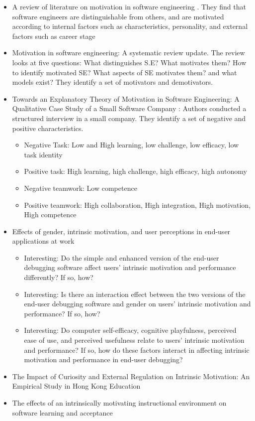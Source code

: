 \documentclass[conference]{IEEEtran}
\begin{document}
\begin{itemize}
\item
  A review of literature on motivation in software engineering
  \cite{beecham2008motivation}. They find that software engineers
  are distinguishable from others, and are motivated according to
  internal factors such as characteristics, personality, and external
  factors such as career stage
\item
  Motivation in software engineering: A systematic review
  update\cite{francca2011motivation}. The review looks at five
  questions: What distinguishes S.E? What motivates them? How to
  identify motivated SE? What aspects of SE motivates them? and what
  models exist? They identify a set of motivators and demotivators.
\item
  Towards an Explanatory Theory of Motivation in Software Engineering: A
  Qualitative Case Study of a Small Software Company
  \cite{francca2012towards}: Authors conducted a structured
  interview in a small company. They identify a set of negative and
  positive characteristics.

  \begin{itemize}
  \item
    Negative Task: Low and High learning, low challenge, low efficacy,
    low task identity
  \item
    Positive task: High learning, high challenge, high efficacy, high
    autonomy
  \item
    Negative teamwork: Low competence
  \item
    Positive teamwork: High collaboration, High integration, High
    motivation, High competence
  \end{itemize}
\item
  Effects of gender, intrinsic motivation, and user perceptions in
  end-user applications at work \cite{chintakovid2009effects}

  \begin{itemize}
  \item
    Interesting: Do the simple and enhanced version of the end-user
    debugging software affect users' intrinsic motivation and
    performance differently? If so, how?
  \item
    Interesting: Is there an interaction effect between the two versions
    of the end-user debugging software and gender on users' intrinsic
    motivation and performance? If so, how?
  \item
    Interesting: Do computer self-efficacy, cognitive playfulness,
    perceived ease of use, and perceived usefulness relate to users'
    intrinsic motivation and performance? If so, how do these factors
    interact in affecting intrinsic motivation and performance in
    end-user debugging?
  \end{itemize}
\item
  The Impact of Curiosity and External Regulation on Intrinsic
  Motivation: An Empirical Study in Hong Kong
  Education\cite{hon2012impact}
\item
  The effects of an intrinsically motivating instructional environment
  on software learning and acceptance\cite{davis1994effects}


\end{itemize}
\end{document}
